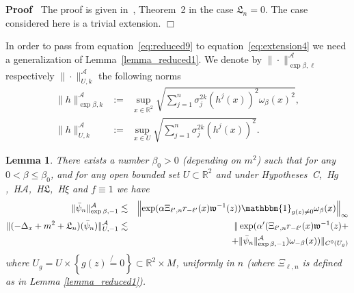 \documentclass[a4paper,10pt]{article}
\newcommand{\assign}{:=}
\newcommand{\nobracket}{}
\newenvironment{proof}{\noindent\textbf{Proof\ }}{\hspace*{\fill}$\Box$\medskip}
\newtheorem{lemma}[theorem]{Lemma}
\begin{document}
\begin{proof}
  The proof is given in~{\cite{Albeverio2018elliptic}}, Theorem~2 in the case
  $\mathfrak{L}_n = 0$. The case considered here is a trivial extension. 
\end{proof}

In order to pass from equation~{\eqref{eq:reduced9}} to
equation~{\eqref{eq:extension4}} we need a generalization of
Lemma~\ref{lemma_reduced1}. We denote by $\| \cdot \|_{\exp \beta,
\ell}^{\mathcal{A}}$ respectively $\| \cdot \|^{\mathcal{A}}_{U, k}$ the
following norms
\[ \begin{array}{lll}
     \| h \|^{\mathcal{A}}_{\exp \beta, k} & \assign & \sup_{x \in
     \mathbb{R}^2} \sqrt{\sum_{j = 1}^n \sigma_j^{2 k} (h^j (x))^2
     \omega_{\beta} (x)^2},\\
     \| h \|^{\mathcal{A}}_{U, k} & \assign & \sup_{x \in U} \sqrt{\sum_{j =
     1}^n \sigma_j^{2 k} (h^j (x))^2} .
   \end{array} \]


\begin{lemma}
  \label{lemma_extension2}There exists a number $\beta_0 > 0$ (depending on
  $m^2$) such that for any $0 < \beta \leqslant \beta_0$, and for any open
  bounded set $U \subset \mathbb{R}^2$ and under
  Hypotheses~C,~H$g$,~H$\mathcal{A}$,~H$\mathfrak{L}$,~H$\xi$ and $f \equiv 1$
  we have
  \begin{eqnarray}
    \| \bar{\psi}_n \|^{\mathcal{A}}_{\exp \beta, - 1} & \lesssim & \left\|
    \exp (\alpha \Xi_{\ell', n} r_{- \ell'} (x) \mathfrak{w}^{- 1} (z))
    \mathbbm{1}_{g (z) \not{=} 0} \omega_{\beta} (x) \right\|_{\infty}
    \label{eq:extension5} \\
    \| (- \Delta_x + m^2 + \mathfrak{L}_n) (\bar{\psi}_n) \|^{\mathcal{A}}_{U,
    - 1} & \lesssim & \nobracket \nobracket \nobracket \| \exp (\alpha'
    (\Xi_{\ell', n} r_{- \ell'} (x) \mathfrak{w}^{- 1} (z) \nobracket
    \nobracket \nobracket \nobracket \nobracket \nobracket + \nonumber\\
    &  & + \nobracket \nobracket \nobracket \nobracket \nobracket \nobracket
    \| \bar{\psi}_n \|^{\mathcal{A}}_{\exp \beta, - 1}) \omega_{- \beta} (x))
    \| \nobracket \nobracket \nobracket_{C^0 (U_g)}  \label{eq:extension6}
  \end{eqnarray}
  where $U_g = U \times \left\{ g (z) \not{=} 0 \right\} \subset \mathbb{R}^2
  \times M$, uniformly in $n$ (where $\Xi_{\ell, n}$ is defined as in Lemma
  \ref{lemma_reduced1}).
\end{lemma}
\end{document}
